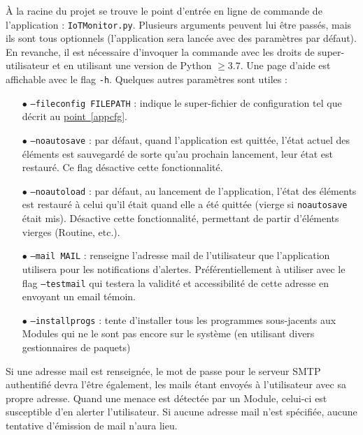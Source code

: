 \documentclass[]{article}
\newcommand{\wordlink}[2]{\hyperref[#1]{#2~\ref{#1}}}
\begin{document}
À la racine du projet se trouve le point d'entrée en ligne de commande de l'application : \texttt{IoTMonitor.py}. Plusieurs arguments peuvent lui être passés, mais ils sont tous optionnels (l'application sera lancée avec des paramètres par défaut). En revanche, il est nécessaire d'invoquer la commande avec les droits de super-utilisateur et en utilisant une version de Python $\geq 3.7$. Une page d'aide est affichable avec le flag \texttt{-h}. Quelques autres paramètres sont utiles :\\
\begin{itemize}
\item[$\bullet$] \texttt{--fileconfig FILEPATH} : indique le super-fichier de configuration tel que décrit au \wordlink{appcfg}{point}.
\vspace{0.2cm}
\item[$\bullet$] \texttt{--noautosave} : par défaut, quand l'application est quittée, l'état actuel des éléments est sauvegardé de sorte qu'au prochain lancement, leur état est restauré. Ce flag désactive cette fonctionnalité.
\vspace{0.2cm}
\item[$\bullet$] \texttt{--noautoload} : par défaut, au lancement de l'application, l'état des éléments est restauré à celui qu'il était quand elle a été quittée (vierge si \texttt{noautosave} était mis). Désactive cette fonctionnalité, permettant de partir d'éléments vierges (Routine, etc.).
\vspace{0.2cm}
\item[$\bullet$] \texttt{--mail MAIL} : renseigne l'adresse mail de l'utilisateur que l'application utilisera pour les notifications d'alertes. Préférentiellement à utiliser avec le flag \texttt{--testmail} qui testera la validité et accessibilité de cette adresse en envoyant un email témoin.
\vspace{0.2cm}
\item[$\bullet$] \texttt{--installprogs} : tente d'installer tous les programmes sous-jacents aux Modules qui ne le sont pas encore sur le système (en utilisant divers gestionnaires de paquets)
\end{itemize}
\vspace{0.2cm}

\par Si une adresse mail est renseignée, le mot de passe pour le serveur SMTP authentifié devra l'être également, les mails étant envoyés à l'utilisateur avec sa propre adresse. Quand une menace est détectée par un Module, celui-ci est susceptible d'en alerter l'utilisateur. Si aucune adresse mail n'est spécifiée, aucune tentative d'émission de mail n'aura lieu.\\
\end{document}
